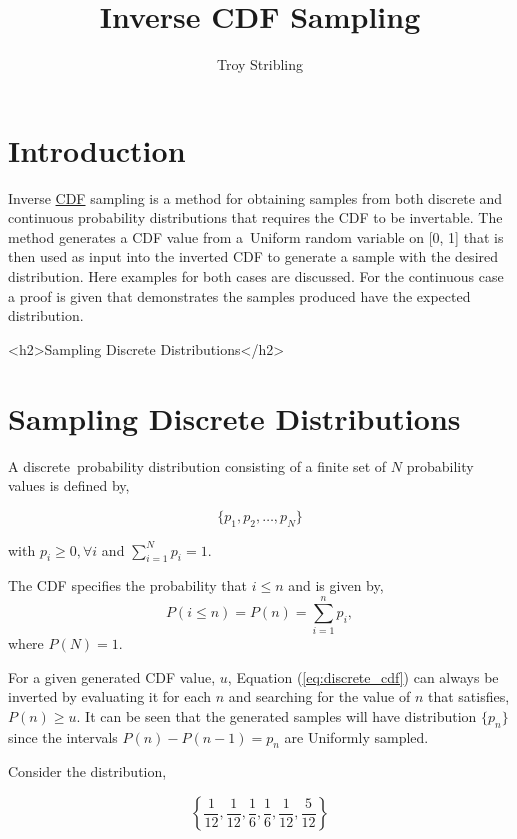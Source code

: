 \documentclass[12pt]{article}
\title{Inverse CDF Sampling}
\author{Troy Stribling}
\begin{document}
\iftex
\maketitle
\section{Introduction}
\fi

Inverse \href{https://en.wikipedia.org/wiki/Cumulative_distribution_function}{CDF} sampling is a method for obtaining samples from both discrete and continuous probability distributions
that requires the CDF to be invertable.
The method generates a CDF value from a Uniform random variable on [0, 1] that is then used as input
into the inverted CDF to generate a sample
with the desired distribution. Here examples for both cases are discussed.
For the continuous case a proof is given that demonstrates the samples produced have the expected distribution.


\ifblog
<h2>Sampling Discrete Distributions</h2>
\fi
\iftex
\section{Sampling Discrete Distributions}
\fi

A discrete probability distribution consisting of a finite set of $N$ probability values is defined by,

$$\{p_1, p_2,\ldots,p_N\}$$

with $p_i \geq 0, \forall i$ and $\sum_{i=1}^N{p_i} = 1.$

The CDF specifies the probability that $i \leq n$ and is given by,
\begin{equation}
\label{eq:discrete_cdf}
P(i \leq n)=P(n)=\sum_{i=1}^n{p_i},
\end{equation}
where $P(N)=1.$

For a given generated CDF value, $u$, Equation (\ref{eq:discrete_cdf}) can always be inverted by evaluating it for each $n$ and
searching for the value of $n$ that satisfies, $P(n) \geq u.$ It can be seen that the generated samples will have
distribution $\{p_n\}$ since the intervals $P(n)-P(n-1) = p_n$ are Uniformly sampled.

Consider the distribution,

\begin{equation} 
\left \{\frac{1}{12}, \frac{1}{12}, \frac{1}{6}, \frac{1}{6}, \frac{1}{12}, \frac{5}{12} \right\}
\label{eq:discrete}
\end{equation}
\end{document}
